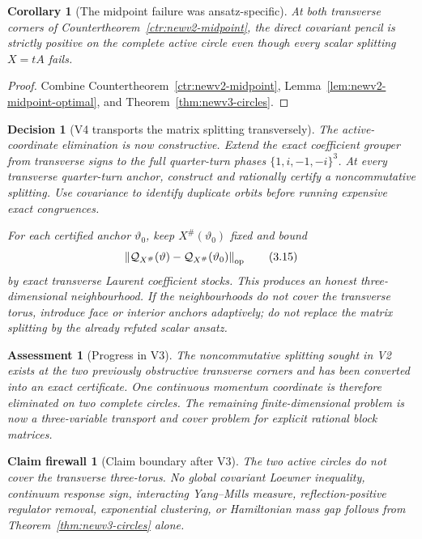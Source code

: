 \documentclass[11pt,oneside]{article}
\newtheorem{corollary}[theorem]{Corollary}
\newtheorem{assessment}[theorem]{Assessment}
\newtheorem{firewall}[theorem]{Claim firewall}
\newtheorem{decision}[theorem]{Decision}
\theoremstyle{definition}
\theoremstyle{remark}
\begin{document}
\begin{corollary}[The midpoint failure was ansatz-specific]
\label{cor:newv3-midpoint}
At both transverse corners of
Countertheorem~\ref{ctr:newv2-midpoint}, the direct covariant pencil
is strictly positive on the complete active circle even though every
scalar splitting \(X=tA\) fails.
\end{corollary}

\begin{proof}
Combine Countertheorem~\ref{ctr:newv2-midpoint},
Lemma~\ref{lem:newv2-midpoint-optimal}, and
Theorem~\ref{thm:newv3-circles}.
\end{proof}

\begin{decision}[V4 transports the matrix splitting transversely]
\label{dec:newv3-next}
The active-coordinate elimination is now constructive.  Extend the
exact coefficient grouper from transverse signs to the full
quarter-turn phases \(\{1,i,-1,-i\}^3\).  At every transverse
quarter-turn anchor, construct and rationally certify a
noncommutative splitting.  Use covariance to identify duplicate
orbits before running expensive exact congruences.

For each certified anchor \(\vartheta_0\), keep \(X^\#(\vartheta_0)\)
fixed and bound
\[
 \left\|{\cal Q}_{X^\#}(\vartheta)
       -{\cal Q}_{X^\#}(\vartheta_0)\right\|_{\mathrm{op}} \tag{3.15}
\]
by exact transverse Laurent coefficient stocks.  This produces an
honest three-dimensional neighbourhood.  If the neighbourhoods do
not cover the transverse torus, introduce face or interior anchors
adaptively; do not replace the matrix splitting by the already
refuted scalar ansatz.
\end{decision}

\begin{assessment}[Progress in V3]
\label{ass:newv3-progress}
The noncommutative splitting sought in V2 exists at the two
previously obstructive transverse corners and has been converted
into an exact certificate.  One continuous momentum coordinate is
therefore eliminated on two complete circles.  The remaining
finite-dimensional problem is now a three-variable transport and
cover problem for explicit rational block matrices.
\end{assessment}

\begin{firewall}[Claim boundary after V3]
\label{fire:newv3-final}
The two active circles do not cover the transverse three-torus.
No global covariant Loewner inequality, continuum response sign,
interacting Yang--Mills measure, reflection-positive regulator
removal, exponential clustering, or Hamiltonian mass gap follows
from Theorem~\ref{thm:newv3-circles} alone.
\end{firewall}
\end{document}
